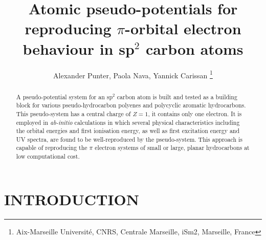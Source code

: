 \documentclass[12pt]{article}
\title{Atomic pseudo-potentials for reproducing $\pi$-orbital electron behaviour in sp$^2$ carbon atoms}
\author{Alexander Punter, Paola Nava, Yannick Carissan \thanks{Aix-Marseille Universit\'e, CNRS, Centrale Marseille, iSm2, Marseille, France}}
\begin{document}
\maketitle


\begin{abstract}
A pseudo-potential system for an sp\(^{2}\) carbon atom is built and tested as a building block for various pseudo-hydrocarbon polyenes and polycyclic aromatic hydrocarbons.  
This pseudo-system has a central charge of $Z=1$, it contains only one electron. It is employed in \textsl{ab-initio} calculations in which several physical characteristics including the orbital energies and first ionisation energy, as well as first excitation energy and UV spectra, are found to be well-reproduced by the pseudo-system. This approach is capable of reproducing the $\pi$ electron systems of small or large, planar hydrocarbons at low computational cost.
\end{abstract}

\clearpage

  \makeatletter
  \renewcommand\@biblabel[1]{#1.}
  \makeatother



\renewcommand{\baselinestretch}{1.5}
\normalsize

\clearpage

\section*{\sffamily \Large INTRODUCTION}
\end{document}
